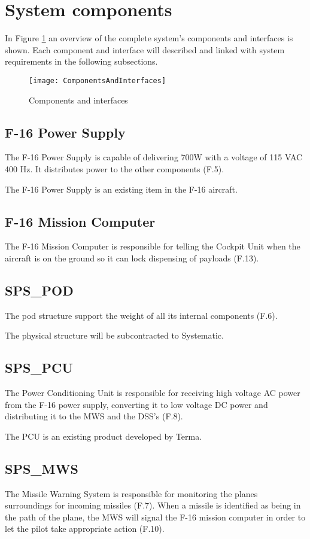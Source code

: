 \documentclass[Main]{subfiles}
\begin{document}
\section{System components}

In Figure \ref{fig:ComponentsAndInterfaces} an overview of the complete system's components and interfaces is shown.
Each component and interface will described and linked with system requirements in the following subsections.

\begin{figure}[H]
\centering
\texttt{[image: ComponentsAndInterfaces]}
\caption{Components and interfaces}
\label{fig:ComponentsAndInterfaces}
\end{figure}

\subsection{F-16 Power Supply}
The F-16 Power Supply is capable of delivering 700W with a voltage of 115 VAC 400 Hz. It distributes power to the other components (F.5).

The F-16 Power Supply is an existing item in the F-16 aircraft.

\subsection{F-16 Mission Computer}
The F-16 Mission Computer is responsible for telling the Cockpit Unit when the aircraft is on the ground so it can lock dispensing of payloads (F.13).

\subsection{SPS\_POD}
The pod structure support the weight of all its internal components (F.6).

The physical structure will be subcontracted to Systematic.

\subsection{SPS\_PCU}
The Power Conditioning Unit is responsible for receiving high voltage AC power from the F-16 power supply, converting it to low voltage DC power and distributing it to the MWS and the DSS's (F.8).

The PCU is an existing product developed by Terma.

\subsection{SPS\_MWS}
The Missile Warning System is responsible for monitoring the planes surroundings for incoming missiles (F.7).
When a missile is identified as being in the path of the plane, the MWS will signal the F-16 mission computer in order to let the pilot take appropriate action (F.10).
\end{document}
